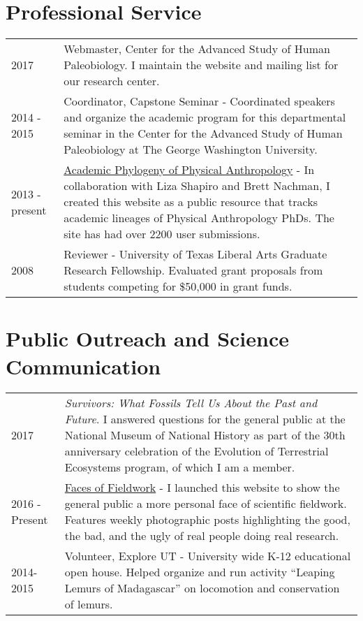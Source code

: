 \documentclass{article}
\begin{document}
\section*{Professional Service}
\begin{longtable}{p{}p{}}
2017 & Webmaster, Center for the Advanced Study of Human Paleobiology. I maintain the website and mailing list for our research center.\\[4pt]
2014 - 2015 & Coordinator, Capstone Seminar - Coordinated speakers and organize the academic program for this departmental seminar in the Center for the Advanced Study of Human Paleobiology at The George Washington University. \\[4pt]
2013 - present &  \href{https://www.physanthphylogeny.org}{Academic Phylogeny of Physical Anthropology} - In collaboration with Liza Shapiro and Brett Nachman, I created this website as a public resource that tracks academic lineages of Physical Anthropology PhDs. The site has had over 2200 user submissions.\\[4pt]

 2008 & Reviewer - University of Texas Liberal Arts Graduate Research Fellowship. Evaluated grant proposals from students competing for \$50,000 in grant funds.\\
\end{longtable}

\section*{Public Outreach and Science Communication}
\begin{longtable}{p{}p{}}
2017 & \emph{Survivors: What Fossils Tell Us About the Past and Future}. I answered questions for the general public at the National Museum of National History as part of the 30th anniversary celebration of the Evolution of Terrestrial Ecosystems program, of which I am a member. \\[4pt]
2016 - Present & \href{http://facesoffieldwork.com}{Faces of Fieldwork} - I launched this website to show the general public a more personal face of scientific fieldwork. Features weekly photographic posts highlighting the good, the bad, and the ugly of real people doing real research.\\[4pt]
2014-2015 & Volunteer, Explore UT - University wide K-12 educational open house. Helped organize and run activity ``Leaping Lemurs of Madagascar'' on locomotion and conservation of lemurs.\\
\end{longtable}
\end{document}
